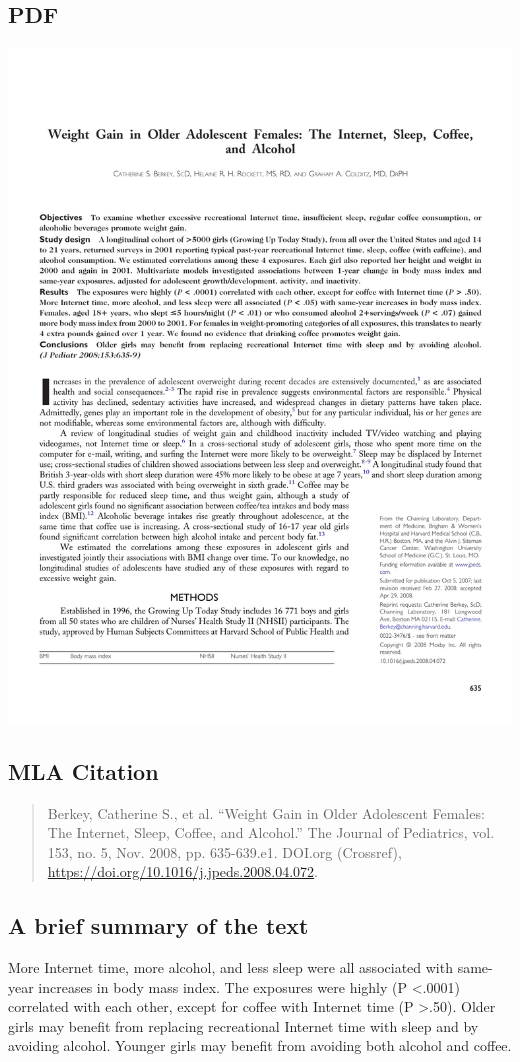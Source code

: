 \documentclass{scrartcl}
\begin{document}
\subsection{PDF}
\label{sec:orgeb93ada}
\begin{center}
\includegraphics[width=.9\linewidth]{./citations/WeightGainIn.pdf}
\end{center}
\subsection{MLA Citation}
\label{sec:org58b0a2b}
\begin{quote}
Berkey, Catherine S., et al. “Weight Gain in Older Adolescent Females: The Internet, Sleep, Coffee, and Alcohol.” The Journal of Pediatrics, vol. 153, no. 5, Nov. 2008, pp. 635-639.e1. DOI.org (Crossref), \url{https://doi.org/10.1016/j.jpeds.2008.04.072}.
\end{quote}
\subsection{A brief summary of the text}
\label{sec:orgc56d901}
More Internet time, more alcohol, and less sleep were all associated with same-year increases in body mass index. The exposures were highly (P <.0001) correlated with each other, except for coffee with Internet time (P >.50). Older girls may benefit from replacing recreational Internet time with sleep and by avoiding alcohol. Younger girls may benefit from avoiding both alcohol and coffee.
\end{document}
